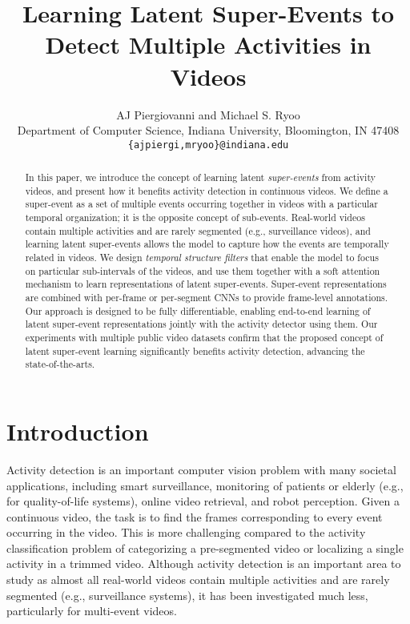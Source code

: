 \documentclass[10pt,twocolumn,letterpaper]{article}
\begin{document}
\title{Learning Latent Super-Events to Detect Multiple Activities in Videos}

\author{AJ Piergiovanni and Michael S. Ryoo\\
Department of Computer Science, Indiana University, Bloomington, IN 47408 \\
\texttt{\{ajpiergi,mryoo\}@indiana.edu}\\
}

\maketitle
\thispagestyle{empty}

\begin{abstract}
In this paper, we introduce the concept of learning latent \emph{super-events} from activity videos, and present how it benefits activity detection in continuous videos. We define a super-event as a set of multiple events occurring together in videos with a particular temporal organization; it is the opposite concept of sub-events. Real-world videos contain multiple activities and are rarely segmented (e.g., surveillance videos), and learning latent super-events allows the model to capture how the events are temporally related in videos. We design \emph{temporal structure filters} that enable the model to focus on particular sub-intervals of the videos, and use them together with a soft attention mechanism to learn representations of latent super-events. Super-event representations are combined with per-frame or per-segment CNNs to provide frame-level annotations. Our approach is designed to be fully differentiable, enabling end-to-end learning of latent super-event representations jointly with the activity detector using them. Our experiments with multiple public video datasets confirm that the proposed concept of latent super-event learning significantly benefits activity detection, advancing the state-of-the-arts.
\end{abstract}


\section{Introduction}
Activity detection is an important computer vision problem with many societal applications, including smart surveillance, monitoring of patients or elderly (e.g., for quality-of-life systems), online video retrieval, and robot perception. Given a continuous video, the task is to find the frames corresponding to every event occurring in the video. This is more challenging compared to the activity classification problem of categorizing a pre-segmented video or localizing a single activity in a trimmed video. Although activity detection is an important area to study as almost all real-world videos contain multiple activities and are rarely segmented (e.g., surveillance systems), it has been investigated much less, particularly for multi-event videos.
\end{document}
